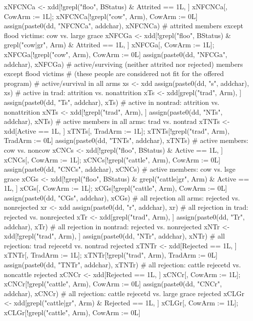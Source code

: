 \begin{Schunk}
\begin{Sinput}
{{    xNFCNCa <- xdd[!grepl("floo", BStatus) & Attrited == 1L, ]
    xNFCNCa[, CowArm := 1L]; xNFCNCa[!grepl("cow", Arm), CowArm := 0L]
    assign(paste0(dd, "NFCNCa", addchar), xNFCNCa)
    # attrited members except flood victims: cow vs. large grace
    xNFCGa <- xdd[!grepl("floo", BStatus) & grepl("cow|gr", Arm) & Attrited == 1L, ]
    xNFCGa[, CowArm := 1L]; xNFCGa[!grepl("cow", Arm), CowArm := 0L]
    assign(paste0(dd, "NFCGa", addchar), xNFCGa)
    # active/surviving (neither attrited nor rejected) members except flood victims 
    # (these people are considered not fit for the offered program)
    # active/survival in all arms
    xs <- xdd
    assign(paste0(dd, "s", addchar), xs)
    # active in trad: attrition vs. nonattrition
    xTs <- xdd[grepl("trad", Arm), ]
    assign(paste0(dd, "Ts", addchar), xTs)
    # active in nontrad: attrition vs. nonattrition
    xNTs <- xdd[!grepl("trad", Arm), ]
    assign(paste0(dd, "NTs", addchar), xNTs)
    # active members in all arms: trad vs. nontrad
    xTNTs <- xdd[Active == 1L, ]
    xTNTs[, TradArm := 1L]; xTNTs[!grepl("trad", Arm), TradArm := 0L]
    assign(paste0(dd, "TNTs", addchar), xTNTs)
    # active members: cow vs. noncow
    xCNCs <- xdd[!grepl("floo", BStatus) & Active == 1L, ]
    xCNCs[, CowArm := 1L]; xCNCs[!grepl("cattle", Arm), CowArm := 0L]
    assign(paste0(dd, "CNCs", addchar), xCNCs)
    # active members: cow vs. lsge grace
    xCGs <- xdd[!grepl("floo", BStatus) & grepl("cattle|gr", Arm) & Active == 1L, ]
    xCGs[, CowArm := 1L]; xCGs[!grepl("cattle", Arm), CowArm := 0L]
    assign(paste0(dd, "CGs", addchar), xCGs)
    # all rejection all arms: rejected vs. nonrejected
    xr <- xdd
    assign(paste0(dd, "r", addchar), xr)
    # all rejection in trad: rejected vs. nonrejected
    xTr <- xdd[grepl("trad", Arm), ]
    assign(paste0(dd, "Tr", addchar), xTr)
    # all rejection in nontrad: rejected vs. nonrejected
    xNTr <- xdd[!grepl("trad", Arm), ]
    assign(paste0(dd, "NTr", addchar), xNTr)
    # all rejection: trad rejecetd vs. nontrad rejected
    xTNTr <- xdd[Rejected == 1L, ]
    xTNTr[, TradArm := 1L]; xTNTr[!grepl("trad", Arm), TradArm := 0L]
    assign(paste0(dd, "TNTr", addchar), xTNTr)
    # all rejection: cattle rejecetd vs. noncattle rejected
    xCNCr <- xdd[Rejected == 1L, ]
    xCNCr[, CowArm := 1L]; xCNCr[!grepl("cattle", Arm), CowArm := 0L]
    assign(paste0(dd, "CNCr", addchar), xCNCr)
    # all rejection: cattle rejecetd vs. large grace rejected
    xCLGr <- xdd[grepl("cattle|gr", Arm) & Rejected == 1L, ]
    xCLGr[, CowArm := 1L]; xCLGr[!grepl("cattle", Arm), CowArm := 0L]
}}
\end{Sinput}
\end{Schunk}
